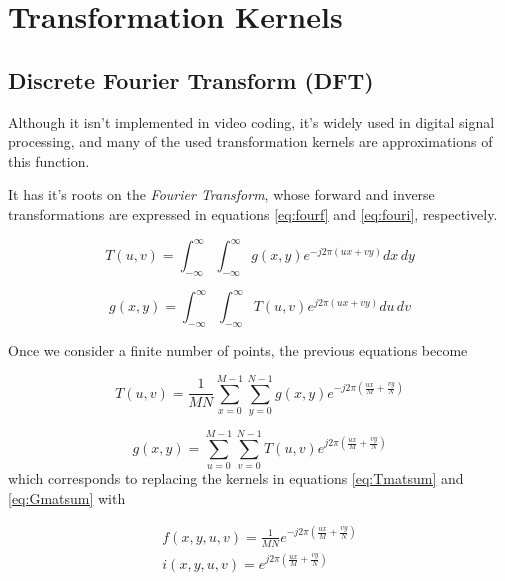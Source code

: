 \section{Transformation Kernels}



\subsection{Discrete Fourier Transform (DFT)}

Although it isn't implemented in video coding, it's widely used in digital signal processing, and many of the used transformation kernels are approximations of this function.

It has it's roots on the \emph{Fourier Transform}, whose forward and inverse transformations are expressed in equations \ref{eq:fourf} and \ref{eq:fouri}, respectively.

\begin{equation} \label{eq:fourf}
    T(u,v) = \int_{-\infty}^{\infty}\int_{-\infty}^{\infty}g(x,y)e^{-j2\pi(ux+vy)} dx \, dy
\end{equation}

\begin{equation} \label{eq:fouri}
    g(x,y) = \int_{-\infty}^{\infty}\int_{-\infty}^{\infty}T(u,v)e^{j2\pi(ux+vy)} du \, dv
\end{equation}

Once we consider a finite number of points, the previous equations become

\begin{equation} \label{eq:dftf}
    T(u,v) = \frac{1}{MN}\sum_{x=0}^{M-1}\sum_{y=0}^{N-1}g(x,y)e^{-j2\pi \left(\frac{ux}{M}+\frac{vy}{N}\right)}
\end{equation}

\begin{equation} \label{eq:dfti}
    g(x,y) = \sum_{u=0}^{M-1}\sum_{v=0}^{N-1}T(u,v)e^{j2\pi \left(\frac{ux}{M}+\frac{vy}{N}\right)}
\end{equation}
which corresponds to replacing the kernels in equations \ref{eq:Tmatsum} and \ref{eq:Gmatsum} with

\begin{gather}
    f(x,y,u,v) = \frac{1}{MN} e^{-j2\pi \left(\frac{ux}{M}+\frac{vy}{N}\right)} \\
    i(x,y,u,v) = e^{j2\pi \left(\frac{ux}{M}+\frac{vy}{N}\right)}
\end{gather}

